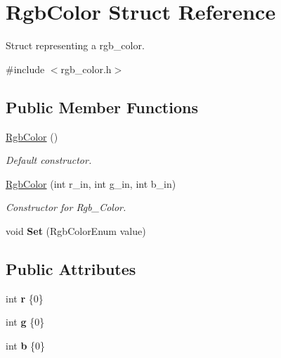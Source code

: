 \hypertarget{structRgbColor}{}\section{Rgb\+Color Struct Reference}
\label{structRgbColor}


Struct representing a rgb\+\_\+color.  




{\ttfamily \#include $<$rgb\+\_\+color.\+h$>$}

\subsection*{Public Member Functions}
\begin{DoxyCompactItemize}
\item 
\hyperlink{structRgbColor_a264da0270aca412d62197e046b71b08e}{Rgb\+Color} ()
\begin{DoxyCompactList}\small\item\em Default constructor. \end{DoxyCompactList}\item 
\hyperlink{structRgbColor_a61e213533bfff019aebd27f991688222}{Rgb\+Color} (int r\+\_\+in, int g\+\_\+in, int b\+\_\+in)
\begin{DoxyCompactList}\small\item\em Constructor for Rgb\+\_\+\+Color. \end{DoxyCompactList}\item 
void {\bfseries Set} (Rgb\+Color\+Enum value)\hypertarget{structRgbColor_a57fcd9161e0ee6a38e707c5002db55b8}{}\label{structRgbColor_a57fcd9161e0ee6a38e707c5002db55b8}

\end{DoxyCompactItemize}
\subsection*{Public Attributes}
\begin{DoxyCompactItemize}
\item 
int {\bfseries r} \{0\}\hypertarget{structRgbColor_aa6c2fac108029c79f7cc96fb6d34717f}{}\label{structRgbColor_aa6c2fac108029c79f7cc96fb6d34717f}

\item 
int {\bfseries g} \{0\}\hypertarget{structRgbColor_afbc54745bd4ed7ede168e31922143eff}{}\label{structRgbColor_afbc54745bd4ed7ede168e31922143eff}

\item 
int {\bfseries b} \{0\}\hypertarget{structRgbColor_af1ba4837230cfc3b0f31454ccdb03df6}{}\label{structRgbColor_af1ba4837230cfc3b0f31454ccdb03df6}

\end{DoxyCompactItemize}


